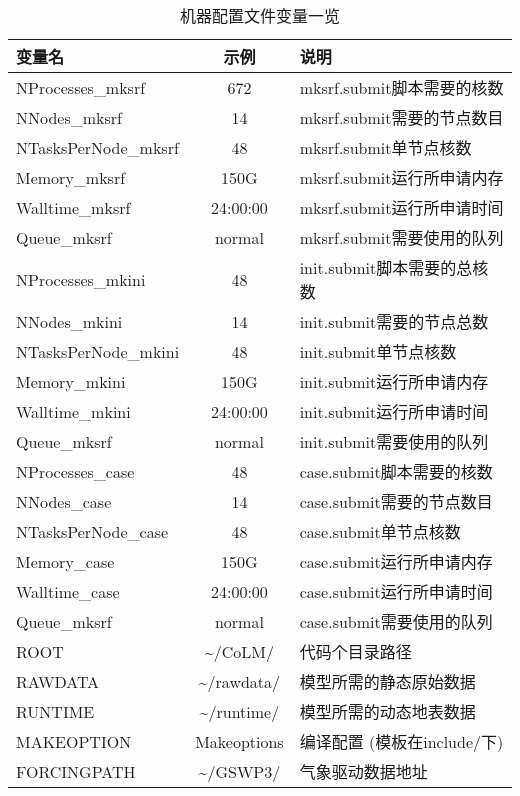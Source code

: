 \documentclass[a4paper,12pt,twoside]{article}
\begin{document}
\begin{table}[!htbp]
\caption{机器配置文件变量一览} \label{table_machineconfig}
\centering \renewcommand{\arraystretch}{1.2}
\begin{tabular}{lcp{}}
\toprule
\textbf{变量名} & \textbf{示例} & \textbf{说明} \\ \midrule
NProcesses\_mksrf & 672 & mksrf.submit脚本需要的核数 \\
NNodes\_mksrf & 14 & mksrf.submit需要的节点数目 \\
NTasksPerNode\_mksrf & 48 & mksrf.submit单节点核数 \\
Memory\_mksrf & 150G & mksrf.submit运行所申请内存 \\
Walltime\_mksrf & 24:00:00 & mksrf.submit运行所申请时间 \\
Queue\_mksrf & normal & mksrf.submit需要使用的队列 \\
NProcesses\_mkini & 48 &init.submit脚本需要的总核数 \\
NNodes\_mkini & 14 & init.submit需要的节点总数 \\
NTasksPerNode\_mkini & 48 & init.submit单节点核数 \\
Memory\_mkini & 150G & init.submit运行所申请内存 \\
Walltime\_mkini & 24:00:00 & init.submit运行所申请时间 \\
Queue\_mksrf & normal & init.submit需要使用的队列 \\
NProcesses\_case & 48 & case.submit脚本需要的核数 \\
NNodes\_case & 14 & case.submit需要的节点数目 \\
NTasksPerNode\_case & 48 & case.submit单节点核数 \\
Memory\_case & 150G & case.submit运行所申请内存 \\
Walltime\_case & 24:00:00 & case.submit运行所申请时间 \\
Queue\_mksrf & normal & case.submit需要使用的队列 \\
ROOT & \textasciitilde/CoLM/ & 代码个目录路径 \\
RAWDATA & \textasciitilde/rawdata/ & 模型所需的静态原始数据 \\
RUNTIME & \textasciitilde/runtime/ & 模型所需的动态地表数据 \\
MAKEOPTION & Makeoptions & 编译配置 (模板在include/下) \\
FORCINGPATH & \textasciitilde/GSWP3/ &气象驱动数据地址 \\
\bottomrule
\end{tabular} 
\end{table}
\end{document}
